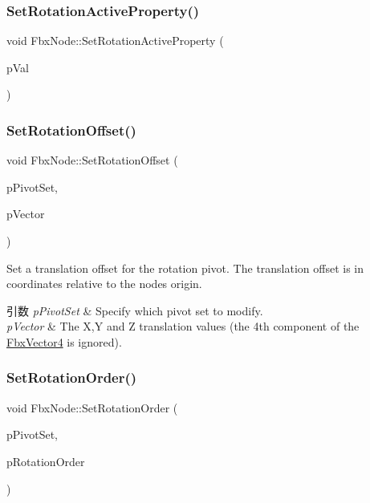 \subsubsection{\texorpdfstring{Set\+Rotation\+Active\+Property()}{SetRotationActiveProperty()}}
{\footnotesize\ttfamily void Fbx\+Node\+::\+Set\+Rotation\+Active\+Property (\begin{DoxyParamCaption}\item[{bool}]{p\+Val }\end{DoxyParamCaption})}

\mbox{\label{class_fbx_node_adfb076b476353dde01ba411c487477bf}} 
\subsubsection{\texorpdfstring{Set\+Rotation\+Offset()}{SetRotationOffset()}}
{\footnotesize\ttfamily void Fbx\+Node\+::\+Set\+Rotation\+Offset (\begin{DoxyParamCaption}\item[{\hyperlink{class_fbx_node_ae62b7311ac4727654cdf1ebd5cbf7343}{E\+Pivot\+Set}}]{p\+Pivot\+Set,  }\item[{\hyperlink{class_fbx_vector4}{Fbx\+Vector4}}]{p\+Vector }\end{DoxyParamCaption})}

Set a translation offset for the rotation pivot. The translation offset is in coordinates relative to the node\textquotesingle{}s origin. 
\begin{DoxyParams}{引数}
{\em p\+Pivot\+Set} & Specify which pivot set to modify. \\
\hline
{\em p\+Vector} & The X,Y and Z translation values (the 4th component of the \hyperlink{class_fbx_vector4}{Fbx\+Vector4} is ignored). \\
\hline
\end{DoxyParams}
\mbox{\label{class_fbx_node_a360b2d1aba9f7a7cf0b09f1d4e921885}} 
\subsubsection{\texorpdfstring{Set\+Rotation\+Order()}{SetRotationOrder()}}
{\footnotesize\ttfamily void Fbx\+Node\+::\+Set\+Rotation\+Order (\begin{DoxyParamCaption}\item[{\hyperlink{class_fbx_node_ae62b7311ac4727654cdf1ebd5cbf7343}{E\+Pivot\+Set}}]{p\+Pivot\+Set,  }\item[{\hyperlink{fbxmath_8h_ae46778666b56bb0abe5992b855fe9332}{E\+Fbx\+Rotation\+Order}}]{p\+Rotation\+Order }\end{DoxyParamCaption})}


